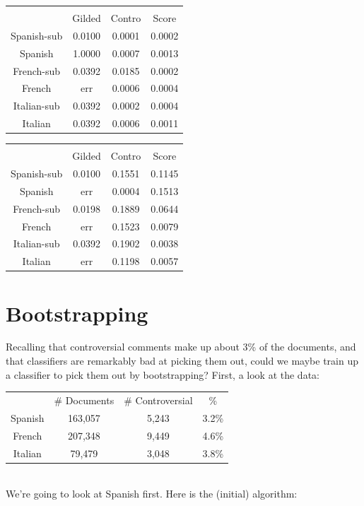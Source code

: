 \documentclass[11pt]{article} %
\begin{document}
\begin{tabular}{|c|c|c|c|}
\rowcolor{gray!50}\multicolumn{4}{|c|}{naive bayes} \\
& Gilded&Contro&Score \\
Spanish-sub & 0.0100& 0.0001& 0.0002\\
Spanish & 1.0000& 0.0007& 0.0013\\
French-sub & 0.0392& 0.0185& 0.0002\\
French & err& 0.0006& 0.0004\\
Italian-sub & 0.0392& 0.0002& 0.0004\\
Italian & 0.0392& 0.0006& 0.0011\\
\end{tabular}
\quad {}
\begin{tabular}{|c|c|c|c|}
\rowcolor{gray!50}\multicolumn{4}{|c|}{logistic regression} \\
& Gilded&Contro&Score \\
Spanish-sub & 0.0100& 0.1551& 0.1145\\
Spanish & err& 0.0004& 0.1513\\
French-sub & 0.0198& 0.1889& 0.0644\\
French & err& 0.1523& 0.0079\\
Italian-sub & 0.0392& 0.1902& 0.0038\\
Italian & err& 0.1198& 0.0057\\
\end{tabular}



\section{Bootstrapping}
Recalling that controversial comments make up about 3\% of the documents, and that classifiers are remarkably bad at picking them out, could we maybe train up a classifier to pick them out by bootstrapping? First, a look at the data:\\
\begin{tabular}{|c|c|c|c|}
\rowcolor{gray!50} & \# Documents & \# Controversial & \% \\
Spanish & 163,057 & 5,243 & 3.2\% \\
French & 207,348 & 9,449 & 4.6\% \\
Italian & 79,479 & 3,048 & 3.8\% \end{tabular}\\


We're going to look at Spanish first. Here is the (initial) algorithm:
\end{document}

